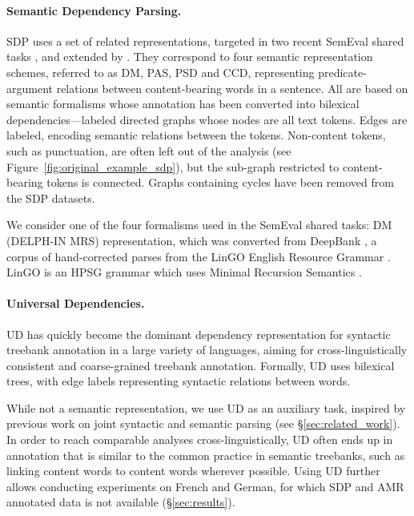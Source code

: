 \documentclass[11pt,a4paper]{article}
\begin{document}
\paragraph{Semantic Dependency Parsing.}\label{sec:sdp}

SDP uses a set of related representations, targeted in two recent SemEval shared tasks 
\cite{oepen2014semeval,oepen2015semeval}, and extended by \citet{oepen2016towards}.
They correspond to four semantic representation schemes, referred to as
DM, PAS, PSD and CCD, representing
predicate-argument relations between content-bearing words in a sentence.
All are based on semantic formalisms whose annotation has been
converted into bilexical dependencies---labeled
directed graphs whose nodes are all text tokens.
Edges are labeled, encoding semantic relations between the tokens.
Non-content tokens, such as punctuation,
are often left out of the analysis (see Figure~\ref{fig:original_example_sdp}),
but the sub-graph restricted to content-bearing tokens is connected.
Graphs containing cycles have been removed from the SDP datasets.

We consider one of the four formalisms used
in the SemEval shared tasks: DM (DELPH-IN MRS) representation, which was converted from 
DeepBank \cite{flickinger2012deepbank}, a corpus of hand-corrected parses from the LinGO
English Resource Grammar \cite{copestake2000open}.
LinGO is an HPSG grammar \cite{pollard1994head}
which uses Minimal Recursion Semantics \cite{copestake2005minimal}.


\paragraph{Universal Dependencies.}\label{sec:ud}
UD \cite{nivre2016universal,11234/1-2515} has quickly become
the dominant dependency representation for
syntactic treebank annotation in a large variety of languages,
aiming for cross-linguistically consistent and coarse-grained treebank
annotation. Formally, UD uses bilexical trees, with edge labels 
representing syntactic relations between words.

While not a semantic representation,
we use UD as an auxiliary task,
inspired by previous work on joint syntactic and semantic parsing
(see \S\ref{sec:related_work}).
In order to reach comparable analyses cross-linguistically,
UD often ends up in annotation that is similar to the common practice
in semantic treebanks, such as linking content words to content words wherever possible.
Using UD further allows conducting experiments on French and German, 
for which SDP and AMR annotated data is not available (\S\ref{sec:results}).
\end{document}
